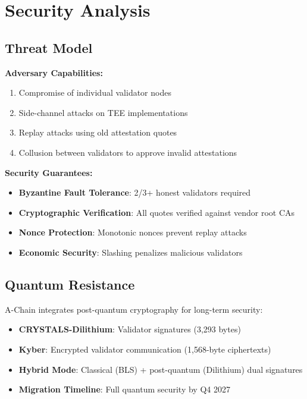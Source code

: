 \documentclass[11pt,a4paper]{article}
\begin{document}
\section{Security Analysis}

\subsection{Threat Model}

\textbf{Adversary Capabilities:}
\begin{enumerate}
\item Compromise of individual validator nodes
\item Side-channel attacks on TEE implementations
\item Replay attacks using old attestation quotes
\item Collusion between validators to approve invalid attestations
\end{enumerate}

\textbf{Security Guarantees:}
\begin{itemize}
\item \textbf{Byzantine Fault Tolerance}: 2/3+ honest validators required
\item \textbf{Cryptographic Verification}: All quotes verified against vendor root CAs
\item \textbf{Nonce Protection}: Monotonic nonces prevent replay attacks
\item \textbf{Economic Security}: Slashing penalizes malicious validators
\end{itemize}

\subsection{Quantum Resistance}

A-Chain integrates post-quantum cryptography for long-term security:

\begin{itemize}
\item \textbf{CRYSTALS-Dilithium}: Validator signatures (3,293 bytes)
\item \textbf{Kyber}: Encrypted validator communication (1,568-byte ciphertexts)
\item \textbf{Hybrid Mode}: Classical (BLS) + post-quantum (Dilithium) dual signatures
\item \textbf{Migration Timeline}: Full quantum security by Q4 2027
\end{itemize}
\end{document}
